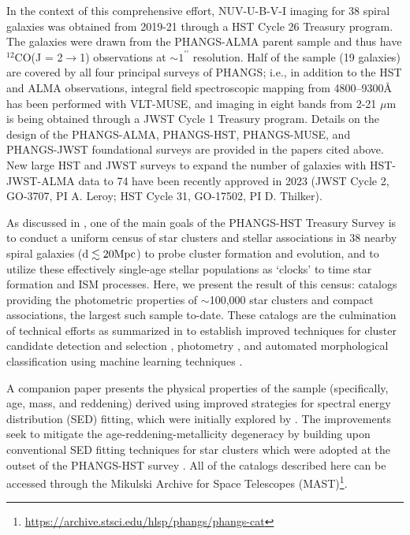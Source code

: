 \documentclass[linenumbers]{aastex63}
\begin{document}
In the context of this comprehensive effort, NUV-U-B-V-I imaging for 38 spiral galaxies was obtained from 2019-21 through a HST Cycle 26 Treasury program.  The galaxies were drawn from the PHANGS-ALMA parent sample and thus have $^{12}$CO(J = 2$\rightarrow$1) observations at $\sim1^{\prime\prime}$ resolution.  Half of the sample (19 galaxies) are covered by all four principal surveys of PHANGS; i.e., in addition to the HST and ALMA observations, integral field spectroscopic mapping from 4800–9300\AA\, has been performed with VLT-MUSE, and imaging in eight bands from 2-21 $\mu$m is being obtained through a JWST Cycle 1 Treasury program.  Details on the design of the PHANGS-ALMA, PHANGS-HST, PHANGS-MUSE, and PHANGS-JWST foundational surveys are provided in the papers cited above.  New large HST and JWST surveys to expand the number of galaxies with HST-JWST-ALMA data to 74 have been recently approved in 2023 (JWST Cycle 2, GO-3707, PI A. Leroy; HST Cycle 31, GO-17502, PI D. Thilker).

As discussed in \cite{lee_phangs-hst_2022}, one of the main goals of the PHANGS-HST Treasury Survey is to conduct a uniform census of star clusters and stellar associations in 38 nearby spiral galaxies (${\rm d \lesssim 20 Mpc}$) to probe cluster formation and evolution, and to utilize these effectively single-age stellar populations as `clocks' to time star formation and ISM processes.  Here, we present the result of this census: catalogs providing the photometric properties of $\sim$100,000 star clusters and compact associations, the largest such sample to-date.  These catalogs are the culmination of technical efforts as summarized in \cite{lee_phangs-hst_2022} to establish improved techniques for cluster candidate detection and selection \citep{whitmore_star_2021, thilker_phangs-hst_2022}, photometry \citep{deger_bright_2022}, and automated morphological classification using machine learning techniques \citep{wei_deep_2020, whitmore_star_2021, hannon_star_2023}.  

A companion paper \citep[][hereafter Paper II]{thilker23sed} presents the physical properties of the sample (specifically, age, mass, and reddening) derived using improved strategies for spectral energy distribution (SED) fitting, which were initially explored by \citet{whitmore_improving_2023}.  The improvements seek to mitigate the age-reddening-metallicity degeneracy by building upon conventional SED fitting techniques for star clusters which were adopted at the outset of the PHANGS-HST survey \citep{turner_phangs-hst_2021}.  All of the catalogs described here can be accessed through the Mikulski Archive for Space Telescopes (MAST)\footnote{\url{https://archive.stsci.edu/hlsp/phangs/phangs-cat}}.
\end{document}
